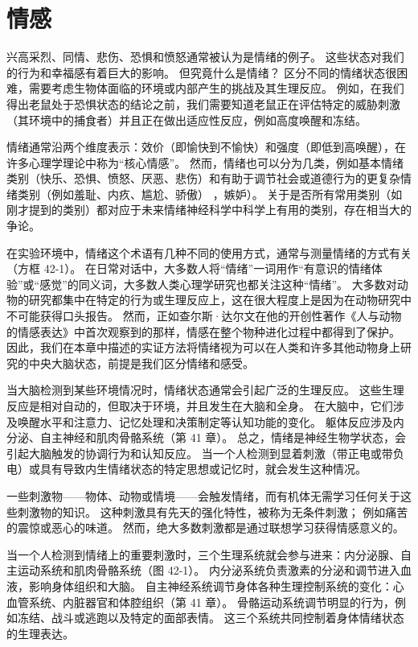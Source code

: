 \chapter{情感}

兴高采烈、同情、悲伤、恐惧和愤怒通常被认为是情绪的例子。 这些状态对我们的行为和幸福感有着巨大的影响。 但究竟什么是情绪？ 区分不同的情绪状态很困难，需要考虑生物体面临的环境或内部产生的挑战及其生理反应。 例如，在我们得出老鼠处于恐惧状态的结论之前，我们需要知道老鼠正在评估特定的威胁刺激（其环境中的捕食者）并且正在做出适应性反应，例如高度唤醒和冻结。

情绪通常沿两个维度表示：效价（即愉快到不愉快）和强度（即低到高唤醒），在许多心理学理论中称为“核心情感”。 然而，情绪也可以分为几类，例如基本情绪类别（快乐、恐惧、愤怒、厌恶、悲伤）和有助于调节社会或道德行为的更复杂情绪类别（例如羞耻、内疚、尴尬、骄傲） ，嫉妒）。 关于是否所有常用类别（如刚才提到的类别）都对应于未来情绪神经科学中科学上有用的类别，存在相当大的争论。

在实验环境中，情绪这个术语有几种不同的使用方式，通常与测量情绪的方式有关（方框 42-1）。 在日常对话中，大多数人将“情绪”一词用作“有意识的情绪体验”或“感觉”的同义词，大多数人类心理学研究也都关注这种“情绪”。 大多数对动物的研究都集中在特定的行为或生理反应上，这在很大程度上是因为在动物研究中不可能获得口头报告。 然而，正如查尔斯·达尔文在他的开创性著作《人与动物的情感表达》中首次观察到的那样，情感在整个物种进化过程中都得到了保护。 因此，我们在本章中描述的实证方法将情绪视为可以在人类和许多其他动物身上研究的中央大脑状态，前提是我们区分情绪和感受。

当大脑检测到某些环境情况时，情绪状态通常会引起广泛的生理反应。 这些生理反应是相对自动的，但取决于环境，并且发生在大脑和全身。 在大脑中，它们涉及唤醒水平和注意力、记忆处理和决策制定等认知功能的变化。 躯体反应涉及内分泌、自主神经和肌肉骨骼系统（第 41 章）。 总之，情绪是神经生物学状态，会引起大脑触发的协调行为和认知反应。 当一个人检测到显着刺激（带正电或带负电）或具有导致内生情绪状态的特定思想或记忆时，就会发生这种情况。

一些刺激物——物体、动物或情境——会触发情绪，而有机体无需学习任何关于这些刺激物的知识。 这种刺激具有先天的强化特性，被称为无条件刺激； 例如痛苦的震惊或恶心的味道。 然而，绝大多数刺激都是通过联想学习获得情感意义的。

当一个人检测到情绪上的重要刺激时，三个生理系统就会参与进来：内分泌腺、自主运动系统和肌肉骨骼系统（图 42-1）。 内分泌系统负责激素的分泌和调节进入血液，影响身体组织和大脑。 自主神经系统调节身体各种生理控制系统的变化：心血管系统、内脏器官和体腔组织（第 41 章）。 骨骼运动系统调节明显的行为，例如冻结、战斗或逃跑以及特定的面部表情。 这三个系统共同控制着身体情绪状态的生理表达。

